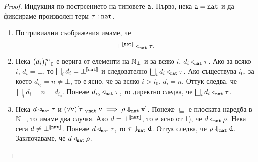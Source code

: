 \begin{proof}
  Индукция по построението на типовете $\texttt{a}$.
  Първо, нека $\texttt{a} = \texttt{nat}$ и да фиксираме произволен терм $\tau : \texttt{nat}$.
  \begin{enumerate}[1)]
  \item
    По тривиални съображения имаме, че
    \[\bot^{\llbracket{\texttt{nat}}\rrbracket} \triangleleft_{\texttt{nat}} \tau.\]
  \item
    Нека $(d_{i})^{\infty}_{i=0}$ е верига от елементи на $\mathbb{N}_\bot$ и за всяко $i$, $d_i \triangleleft_{\texttt{nat}} \tau$.
    Ако за всяко $i$, $d_i = \bot$, то $\bigsqcup_i d_i = \bot^{\llbracket{\texttt{nat}}\rrbracket}$ и следователно $\bigsqcup_i d_i
    \triangleleft_{\texttt{nat}} \tau$.
    Ако съществува $i_0$, за което $d_{i_0} = n \neq \bot$, то е ясно, че за всяко $i > i_0$, $d_i = n$.
    Оттук следва, че $\bigsqcup_i d_i = n = d_{i_0}$.
    Понеже $d_{i_0} \triangleleft_{\texttt{nat}} \tau$, то директно следва, че $\bigsqcup_i d_i \triangleleft_{\texttt{nat}} \tau$.
  \item
    Нека $d \triangleleft_{\texttt{nat}} \tau$ и $(\forall \texttt{v})[\tau \Downarrow_{\texttt{nat}} \texttt{v} \implies \rho
    \Downarrow_{\texttt{nat}} \texttt{v}]$. Понеже $\sqsubseteq$ е плоската наредба в $\mathbb{N}_\bot$, то имаме два случая.
    Ако $d = \bot^{\llbracket{\texttt{nat}}\rrbracket}$, то е ясно от 1), че $d \triangleleft_{\texttt{nat}} \rho$.
    Нека сега $d \neq \bot^{\llbracket{\texttt{nat}}\rrbracket}$. 
    Понеже $d \triangleleft_{\texttt{nat}} \tau$, то $\tau \Downarrow_{\texttt{nat}} \texttt{d}$.
    Оттук следва, че $\rho \Downarrow_{\texttt{nat}} \texttt{d}$. Заключаваме, че $d \triangleleft_{\texttt{nat}} \rho$.    
  \end{enumerate}
  

\end{proof}
